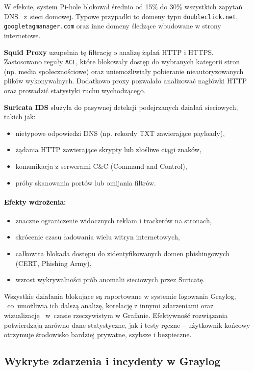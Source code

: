 \documentclass[
    left=2.5cm,         %
    right=2.5cm,        %
    top=2.5cm,          %
    bottom=3cm,         %
    bindingoffset=6mm,  %
    nohyphenation=true %
]{eiti/eiti-thesis} %
\begin{document}
W efekcie, system Pi-hole blokował średnio od 15\% do 30\% wszystkich zapytań  DNS ~z~sieci domowej. Typowe przypadki to domeny typu \texttt{doubleclick.net}, \texttt{googletagmanager.com} oraz inne domeny śledzące wbudowane w strony internetowe.

\textbf{Squid Proxy} uzupełnia tę filtrację o analizę żądań HTTP i HTTPS. Zastosowano reguły \texttt{ACL}, które blokowały dostęp do wybranych kategorii stron 
(np. media społecznościowe) oraz uniemożliwiały pobieranie nieautoryzowanych plików wykonywalnych. Dodatkowo proxy pozwalało analizować nagłówki HTTP oraz prowadzić statystyki ruchu wychodzącego.

\textbf{Suricata IDS} służyła do pasywnej detekcji podejrzanych działań sieciowych, takich jak:
\begin{itemize}
    \item nietypowe odpowiedzi DNS (np. rekordy TXT zawierające payloady),
    \item żądania HTTP zawierające skrypty lub złośliwe ciągi znaków,
    \item komunikacja z serwerami C\&C (Command and Control),
    \item próby skanowania portów lub omijania filtrów.
\end{itemize}

\paragraph{Efekty wdrożenia:}
\begin{itemize}
    \item znaczne ograniczenie widocznych reklam i trackerów na stronach,
    \item skrócenie czasu ładowania wielu witryn internetowych,
    \item całkowita blokada dostępu do zidentyfikowanych domen phishingowych (CERT, Phishing Army),
    \item wzrost wykrywalności prób anomalii sieciowych przez Suricatę.
\end{itemize}

Wszystkie działania blokujące są raportowane w systemie logowania Graylog, ~co~umożliwia ich dalszą analizę, korelację z innymi zdarzeniami oraz wizualizację ~w~czasie rzeczywistym w Grafanie. Efektywność rozwiązania potwierdzają zarówno dane statystyczne, jak i testy ręczne – użytkownik końcowy otrzymuje środowisko bardziej prywatne, szybsze i bezpieczne.


\subsection{Wykryte zdarzenia i incydenty w Graylog}
\end{document}
